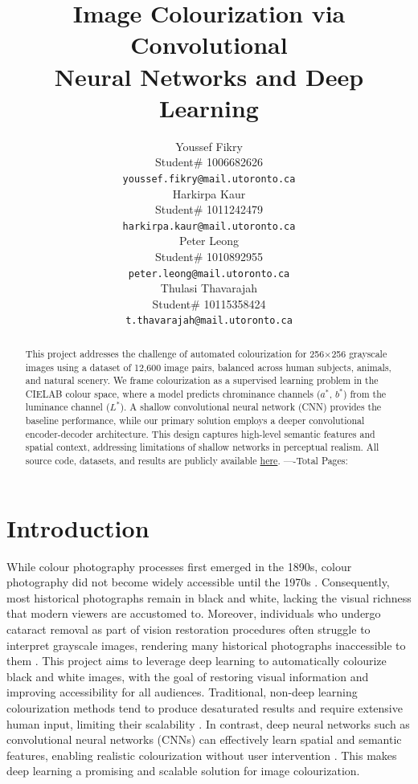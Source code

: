 \documentclass{article} %
\title{Image Colourization via Convolutional \\
Neural Networks and Deep Learning}
\author{Youssef Fikry  \\
Student\# 1006682626\\
\texttt{youssef.fikry@mail.utoronto.ca} \\
\And Harkirpa Kaur  \\
Student\# 1011242479 \\
\texttt{harkirpa.kaur@mail.utoronto.ca} \\
\AND
Peter Leong \\
Student\# 1010892955 \\
\texttt{peter.leong@mail.utoronto.ca} \\
\And
Thulasi Thavarajah \\
Student\# 10115358424 \\
\texttt{t.thavarajah@mail.utoronto.ca} \\
\AND
}
\begin{document}
\maketitle

\begin{abstract}
This project addresses the challenge of automated colourization for 256$\times$256 grayscale images using a dataset of 12,600 image pairs, balanced across human subjects, 
animals, and natural scenery. We frame colourization as a supervised learning problem in the CIELAB colour space, where a model predicts chrominance channels ($a^*$, $b^*$) 
from the luminance channel ($L^*$). A shallow convolutional neural network (CNN) provides the baseline performance, while our primary solution employs a deeper convolutional 
encoder-decoder architecture. This design captures high-level semantic features and spatial context, addressing limitations of shallow networks in perceptual realism. All 
source code, datasets, and results are publicly available \href{https://drive.google.com/drive/folders/1cV1NhlQ8UTk_CgJdwhqeRu0z5xE85ZsI?usp=sharing}{here}. 
----Total Pages: \pageref{last_page}
\end{abstract}


\section{Introduction}

While colour photography processes first emerged in the 1890s, colour photography did not become widely accessible until the 1970s \citep{scienceandmediamuseum2020}. 
Consequently, most historical photographs remain in black and white, lacking the visual richness that modern viewers are accustomed to. Moreover, individuals who undergo cataract 
removal as part of vision restoration procedures often struggle to interpret grayscale images, rendering many historical photographs inaccessible to them \citet{vogelsang2024impact}. 
This project aims to leverage deep learning to automatically colourize black and white images, with the goal of restoring visual information and improving accessibility for all audiences. 
Traditional, non-deep learning colourization methods tend to produce desaturated results and require extensive human input, limiting their scalability \citep{cheng2016deepcolorization}. 
In contrast, deep neural networks such as convolutional neural networks (CNNs) can effectively learn spatial and semantic features, enabling realistic colourization without user 
intervention \citep{zhang2016colorful}. This makes deep learning a promising and scalable solution for image colourization.
\end{document}
